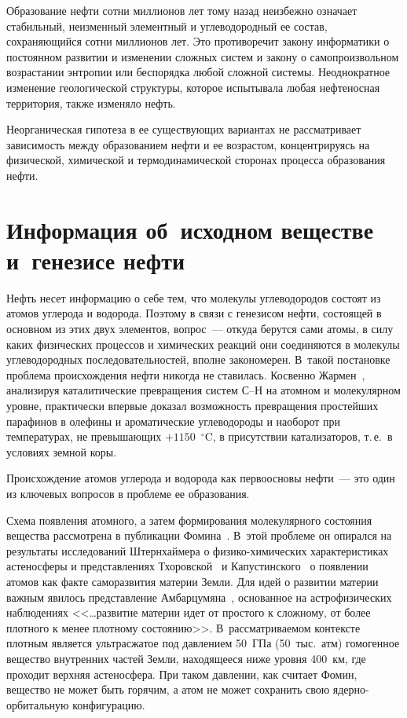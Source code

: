 \begin{multicols}{2}
     Образование нефти сотни миллионов лет тому назад неизбежно означает 
стабильный, неизменный элементный и углеводородный ее состав, сохраняющийся 
сотни миллионов лет. Это противоречит закону информатики о постоянном развитии и 
изменении сложных систем и закону о самопроизвольном возрастании энтропии 
или беспорядка любой сложной системы. Неоднократное изменение геологической 
структуры, которое испытывала любая нефтеносная территория, также изменяло 
нефть. 
     
     Неорганическая гипотеза в ее существующих вариантах не рассматривает 
зависимость между образованием нефти и ее возрастом, концентрируясь на 
физической, химической и термодинамической сторонах процесса образования 
нефти.
     
\section{Информация об~исходном веществе и~генезисе нефти}

     Нефть несет информацию о себе тем, что молекулы углеводородов состоят из 
атомов углерода и водорода. Поэтому в связи с генезисом нефти, состоящей в 
основном из этих двух элементов, вопрос~--- откуда берутся сами атомы, в силу 
каких физических процессов и химических реакций они соединяются в молекулы 
углеводородных последовательностей, вполне закономерен. В~такой постановке 
проблема происхождения нефти никогда не ставилась. Косвенно 
Жармен~\cite{33s}, анализируя каталитические превращения систем С--Н на 
атомном и молекулярном уровне, практически впервые доказал возможность 
превращения простейших парафинов в олефины и ароматические углеводороды и 
наоборот при температурах, не превышающих $+1150$~$^\circ$C, в присутствии 
катализаторов, т.\,е.\ в условиях земной коры.
     
     Происхождение атомов углерода и водорода как первоосновы нефти~--- это 
один из ключевых вопросов в проблеме ее образования.
     
     Схема появления атомного, а затем формирования молекулярного состояния 
вещества рас\-смот\-ре\-на в публикации Фомина~\cite{25s}. В~этой проблеме 
он опирался на результаты исследований Штерн\-хай\-ме\-ра о 
     физико-химических характеристиках астеносферы и представлениях 
Тхоровской~\cite{23s} и Капустинского~\cite{10s} о появлении 
атомов как факте саморазвития материи Земли. Для идей о развитии материи 
важным явилось представление Амбарцумяна~\cite{1s}, основанное на 
астрофизических наблюдениях <<\ldots развитие материи идет от простого к 
сложному, от более плотного к менее плотному состоянию>>. В~рас\-смат\-ри\-ва\-емом 
контексте плотным является ультрасжатое под давлением 50~ГПа (50~тыс.\ атм) 
гомогенное вещество внутренних час\-тей Земли, находящееся ниже уровня 400~км, 
где проходит верхняя астеносфера. При таком давлении, как считает 
Фомин, вещество не может быть горячим, а атом не может сохранить свою 
ядерно-орби\-таль\-ную конфигурацию.
     

\end{multicols}
